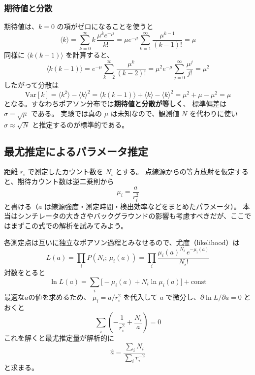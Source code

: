 \documentclass[uplatex,dvipdfmx,12pt,nomag]{jsarticle}
\begin{document}
\subsubsection*{期待値と分散}

期待値は、$k=0$ の項がゼロになることを使うと
\begin{equation}
  \langle k \rangle
  = \sum_{k=0}^{\infty} k\,\frac{\mu^k e^{-\mu}}{k!}
  = \mu e^{-\mu} \sum_{k=1}^{\infty} \frac{\mu^{k-1}}{(k-1)!}
  = \mu
\end{equation}
同様に $\langle k(k-1)\rangle$ を計算すると、
\begin{equation}
  \langle k(k-1) \rangle
  = e^{-\mu}\sum_{k=2}^{\infty}\frac{\mu^k}{(k-2)!}
  = \mu^2 e^{-\mu} \sum_{j=0}^{\infty}\frac{\mu^j}{j!}
  = \mu^2
\end{equation}
したがって分散は
\begin{equation}
  \mathrm{Var}[k]
  = \langle k^2\rangle - \langle k\rangle^2
  = \langle k(k-1)\rangle + \langle k\rangle - \langle k\rangle^2
  = \mu^2 + \mu - \mu^2 = \mu
\end{equation}
となる。すなわちポアソン分布では\textbf{期待値と分散が等しく}、
標準偏差は $\sigma = \sqrt{\mu}$ である。
実験では真の $\mu$ は未知なので、観測値 $N$ を代わりに使い
$\sigma \approx \sqrt{N}$ と推定するのが標準的である。

\subsection{最尤推定によるパラメータ推定}

距離 $r_i$ で測定したカウント数を $N_i$ とする。
点線源からの等方放射を仮定すると、期待カウント数は逆二乗則から
\begin{equation}
  \mu_i = \frac{a}{r_i^2}
  \label{eq:inv-sq}
\end{equation}
と書ける（$a$ は線源強度・測定時間・検出効率などをまとめたパラメータ）。
本当はシンチレータの大きさやバックグラウンドの影響も考慮すべきだが、ここではまずこの式での解析を試みてみよう。

各測定点は互いに独立なポアソン過程とみなせるので、尤度（likelihood）は
\begin{equation}
  L(a) = \prod_{i} P(N_i;\,\mu_i(a))
       = \prod_{i} \frac{\mu_i(a)^{N_i}\,e^{-\mu_i(a)}}{N_i!}
\end{equation}
対数をとると
\begin{equation}
  \ln L(a)
  = \sum_{i} \bigl[-\mu_i(a) + N_i \ln \mu_i(a)\bigr] + \mathrm{const}
  \label{eq:logL}
\end{equation}
最適な$a$の値を求めるため、
$\mu_i = a/r_i^2$ を代入して $a$ で微分し、$\partial \ln L/\partial a = 0$ とおくと
\begin{equation}
  \sum_{i}\left(-\frac{1}{r_i^2} + \frac{N_i}{a}\right) = 0
\end{equation}
これを解くと最尤推定量が解析的に
\begin{equation}
  \hat{a} = \frac{\displaystyle\sum_{i} N_i}{\displaystyle\sum_{i} r_i^{-2}}
  \label{eq:ahat}
\end{equation}
と求まる。
\end{document}
